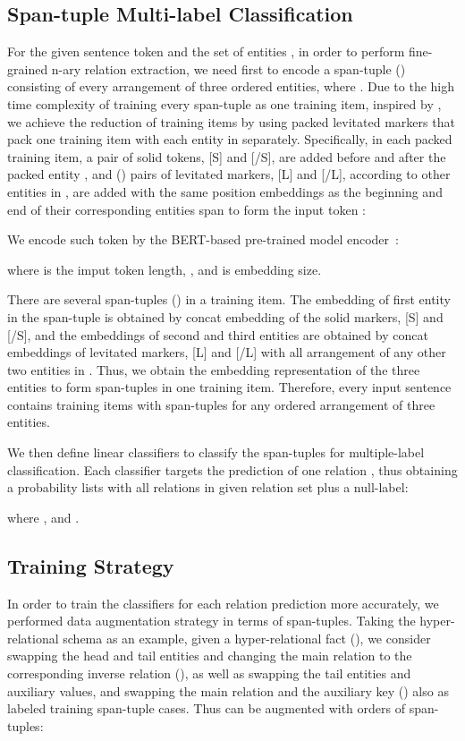 \documentclass{article} \usepackage{iclr2024_conference,times}
\begin{document}
\subsection{Span-tuple Multi-label Classification}

 

For the given sentence token  and the set of entities , in order to perform fine-grained n-ary relation extraction, we need first to encode a span-tuple () consisting of every arrangement of three ordered entities, where . Due to the high time complexity of training every span-tuple as one training item, inspired by \cite{PL-Marker}, we achieve the reduction of training items by using packed levitated markers that pack one training item with each entity in  separately. Specifically, in each packed training item, a pair of solid tokens, [S] and [/S], are added before and after the packed entity , and () pairs of levitated markers, [L] and [/L], according to other entities in , are added with the same position embeddings as the beginning and end of their corresponding entities span  to form the input token :

We encode such token by the BERT-based pre-trained model encoder~\citep{Bert}:

where  is the imput token length, , and  is embedding size.

There are several span-tuples () in a training item. The embedding of first entity  in the span-tuple is obtained by concat embedding of the solid markers, [S] and [/S], and the embeddings of second and third entities  are obtained by concat embeddings of levitated markers, [L] and [/L] with all  arrangement of any other two entities in . Thus, we obtain the embedding representation of the three entities to form  span-tuples in one training item. Therefore, every input sentence contains  training items with  span-tuples for any ordered arrangement of three entities.

We then define  linear classifiers  to classify the span-tuples for multiple-label classification. Each classifier targets the prediction of one relation , thus obtaining a probability lists  with all relations in given relation set  plus a null-label:

where , and . 




\subsection{Training Strategy}
In order to train the  classifiers for each relation prediction more accurately, we performed data augmentation strategy in terms of span-tuples. Taking the hyper-relational schema as an example, given a hyper-relational fact (), we consider swapping the head and tail entities and changing the main relation to the corresponding inverse relation (), as well as swapping the tail entities and auxiliary values, and swapping the main relation and the auxiliary key () also as labeled training span-tuple cases. Thus  can be augmented with  orders of span-tuples:
\end{document}
